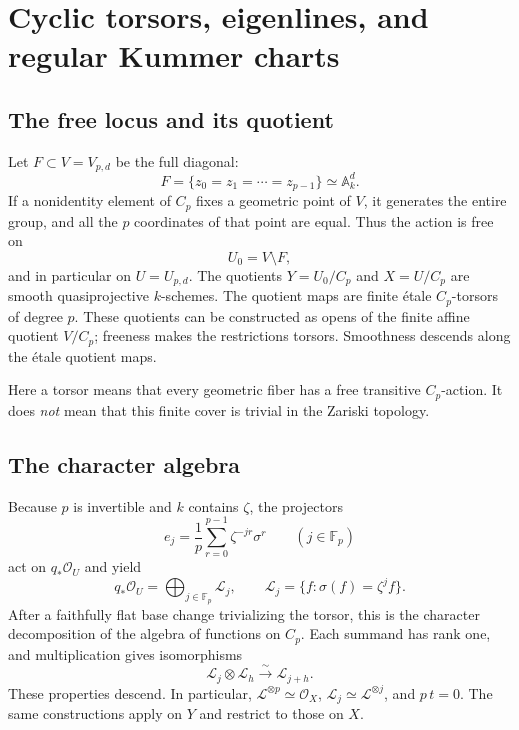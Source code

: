 \documentclass[11pt,a4paper]{article}
\theoremstyle{definition}
\theoremstyle{remark}
\newcommand{\F}{\mathbb F}
\newcommand{\A}{\mathbb A}
\newcommand{\OO}{\mathcal O}
\newcommand{\LL}{\mathcal L}
\begin{document}
\section{Cyclic torsors, eigenlines, and regular Kummer charts}
\label{ka:sec:torsors}

\subsection{The free locus and its quotient}
Let $F\subset V=V_{p,d}$ be the full diagonal:
\[
 F=\{z_0=z_1=\cdots=z_{p-1}\}\simeq\A_k^d.
\]
If a nonidentity element of $C_p$ fixes a geometric point of $V$, it
generates the entire group, and all the $p$ coordinates of that point
are equal. Thus the action is free on
\[
 U_0=V\setminus F,
\]
and in particular on $U=U_{p,d}$. The quotients
$Y=U_0/C_p$ and $X=U/C_p$ are smooth quasiprojective $k$-schemes. The
quotient maps are finite \'etale $C_p$-torsors of degree $p$. These
quotients can be constructed as opens of the finite affine quotient
$V/C_p$; freeness makes the restrictions torsors. Smoothness descends
along the \'etale quotient maps.

Here a torsor means that every geometric fiber has a free transitive
$C_p$-action. It does \emph{not} mean that this finite cover is trivial
in the Zariski topology.

\subsection{The character algebra}
Because $p$ is invertible and $k$ contains $\zeta$, the projectors
\begin{equation}
 e_j=\frac1p\sum_{r=0}^{p-1}\zeta^{-jr}\sigma^r
 \qquad (j\in\F_p)
 \label{ka:eq:projectors}
\end{equation}
act on $q_*\OO_U$ and yield
\begin{equation}
 q_*\OO_U=\bigoplus_{j\in\F_p}\LL_j,
 \qquad \LL_j=\{f:\sigma(f)=\zeta^j f\}.
 \label{ka:eq:eigenalgebra}
\end{equation}
After a faithfully flat base change trivializing the torsor, this is the
character decomposition of the algebra of functions on $C_p$. Each
summand has rank one, and multiplication gives isomorphisms
\begin{equation}
 \LL_j\otimes\LL_h\xrightarrow{\sim}\LL_{j+h}.
 \label{ka:eq:lineproduct}
\end{equation}
These properties descend. In particular, $\LL^{\otimes p}\simeq\OO_X$,
$\LL_j\simeq\LL^{\otimes j}$, and $p\,t=0$.
The same constructions apply on $Y$ and restrict to those on $X$.
\end{document}
